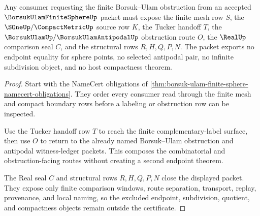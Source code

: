 \begin{theorem}
\label{thm:borsuk-ulam-finite-sphere-obstruction-handoff}
Any consumer requesting the finite Borsuk--Ulam obstruction from an accepted $\BorsukUlamFiniteSphereUp$ packet must expose the finite mesh row $S$, the $\SOneUp/\CompactMetricUp$ source row $K$, the Tucker handoff $T$, the $\BorsukUlamUp/\BorsukUlamAntipodalUp$ obstruction route $O$, the $\RealUp$ comparison seal $C$, and the structural rows $R,H,Q,P,N$. The packet exports no endpoint equality for sphere points, no selected antipodal pair, no infinite subdivision object, and no host compactness theorem.
\end{theorem}
\begin{proof}
Start with the NameCert obligations of \autoref{thm:borsuk-ulam-finite-sphere-namecert-obligations}. They order every consumer read through the finite mesh and compact boundary rows before a labeling or obstruction row can be inspected.

Use the Tucker handoff row $T$ to reach the finite complementary-label surface, then use $O$ to return to the already named Borsuk--Ulam obstruction and antipodal witness-ledger packets. This composes the combinatorial and obstruction-facing routes without creating a second endpoint theorem.

The Real seal $C$ and structural rows $R,H,Q,P,N$ close the displayed packet. They expose only finite comparison windows, route separation, transport, replay, provenance, and local naming, so the excluded endpoint, subdivision, quotient, and compactness objects remain outside the certificate.
\end{proof}



